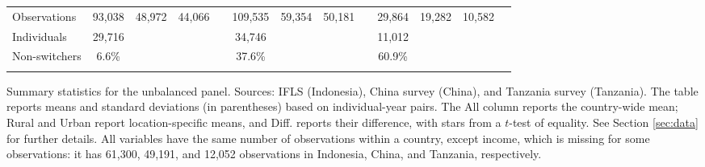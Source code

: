 \begin{table}
\begin{threeparttable}
\begin{tabular}{l cccc cccc cccc}
\cmidrule(lr){2-13}
Observations & 93,038 & 48,972 & 44,066 &  & 109,535 & 59,354 & 50,181 &  & 29,864 & 19,282 & 10,582 &  \\  \addlinespace
Individuals & 29,716 &  &  &  & 34,746 &  &  &  & 11,012 &  &  &  \\
Non-switchers &    6.6\% &  &  &  &   37.6\% &  &  &  &   60.9\% &  &  &  \\  \addlinespace
\bottomrule \end{tabular} \begin{tablenotes}[flushleft] \footnotesize \item{Summary statistics for the unbalanced panel. Sources: IFLS (Indonesia), China survey (China), and Tanzania survey (Tanzania). The table reports means and standard deviations (in parentheses) based on individual-year pairs. The All column reports the country-wide mean; Rural and Urban report location-specific means, and Diff. reports their difference, with stars from a $t$-test of equality. See Section \ref{sec:data} for further details. All variables have the same number of observations within a country, except income, which is missing for some observations: it has 61,300, 49,191, and 12,052 observations in Indonesia, China, and Tanzania, respectively.} \end{tablenotes}
\end{threeparttable}
\end{table}
